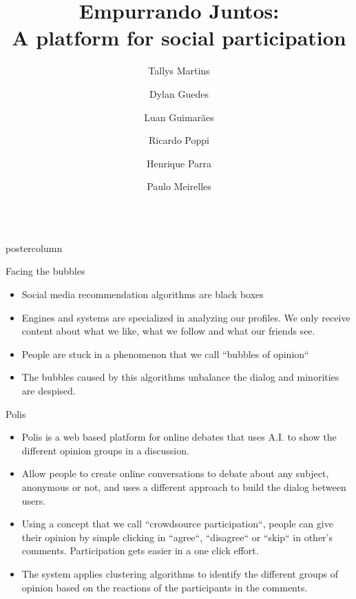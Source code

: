 \documentclass[final,hyperref={pdfpagelabels=false}]{beamer}
\title{\huge\bfseries\hspace*{-1em} Empurrando Juntos: \\A platform for social participation}
\date{}
\author{\large Tallys Martins
\and Dylan Guedes
\and Luan Guimarães \\
\and Ricardo Poppi
\and Henrique Parra
\and Paulo Meirelles
}
\institute[UNB/CD]{University of Brasília and Cidade Democrática NGO, Brazil}
\newlength{\columnheight}
\begin{document}
\begin{frame}
  \begin{columns}
    \begin{column}{.49\textwidth}
      \begin{beamercolorbox}[center,wd=\textwidth]{postercolumn}
        \begin{minipage}[T]{.95\textwidth}
          \parbox[t][\columnheight]{\textwidth}{

\begin{block}{Facing the bubbles}
  \begin{itemize}
    \item Social media recommendation algorithms are black boxes
    
    \item Engines and systems are specialized in analyzing our profiles. We only receive
    content about what we like, what we follow and what our friends see.

    \item People are stuck in a phenomenon that we call ``bubbles of opinion``

    \item The bubbles caused by this algorithms unbalance the dialog and minorities
    are despised.
  \end{itemize}
\end{block}

\begin{block}{Polis}
  \begin{itemize}
    \item Polis is a web based platform for online debates that uses A.I. to
    show the different opinion groups in a discussion.

    \item Allow people to create online conversations to debate about any subject,
    anonymous or not, and uses a different approach to build the dialog between users.

    \item Using a concept that we call ``crowdsource participation``, people can
    give their opinion by simple clicking in ``agree``, ``disagree`` or ``skip``
    in other's comments. Participation gets easier in a one click effort.

    \item The system applies clustering algorithms to identify the different groups
    of opinion based on the reactions of the participants in the comments.


\end{itemize}
\end{block}}
\end{minipage}
\end{beamercolorbox}
\end{column}
\end{columns}
\end{frame}
\end{document}
